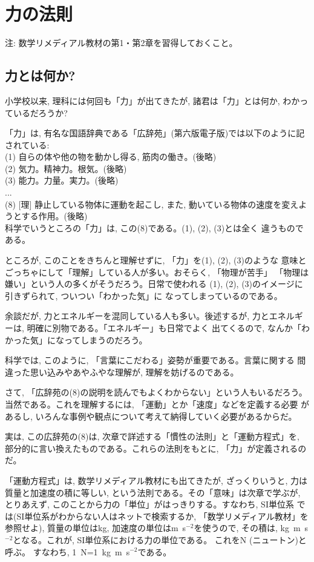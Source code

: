 \chapter{力の法則}
%
{\small 注: 数学リメディアル教材の第1・第2章を習得しておくこと。}

\section{力とは何か?}

小学校以来, 理科には何回も「力」が出てきたが, 諸君は「力」とは何か, わかっているだろうか?

「力」は, 有名な国語辞典である「広辞苑」(第六版電子版)では以下のように記されている:\\
(1) 自らの体や他の物を動かし得る, 筋肉の働き。(後略)\\
(2) 気力。精神力。根気。(後略)\\
(3) 能力。力量。実力。(後略)\\
...\\
(8) [理] 静止している物体に運動を起こし, また, 動いている物体の速度を変えようとする作用。(後略)\\

科学でいうところの「力」は, この(8)である。(1), (2), (3)とは全く
違うものである。

ところが, このことをきちんと理解せずに, 「力」を(1), (2), (3)のような
意味とごっちゃにして「理解」している人が多い。おそらく, 「物理が苦手」
「物理は嫌い」という人の多くがそうだろう。日常で使われる
(1), (2), (3)のイメージに引きずられて, ついつい「わかった気」に
なってしまっているのである。

余談だが, 力とエネルギーを混同している人も多い。後述するが, 
力とエネルギーは, 明確に別物である。「エネルギー」も日常でよく
出てくるので, なんか「わかった気」になってしまうのだろう。

科学では, このように, 「言葉にこだわる」姿勢が重要である。言葉に関する
間違った思い込みやあやふやな理解が, 理解を妨げるのである。

さて, 「広辞苑の(8)の説明を読んでもよくわからない」という人もいるだろう。
当然である。これを理解するには, 「運動」とか「速度」などを定義する必要
があるし, いろんな事例や観点について考えて納得していく必要があるからだ。

実は, この広辞苑の(8)は, 次章で詳述する「慣性の法則」と「運動方程式」を, 
部分的に言い換えたものである。これらの法則をもとに, 「力」が定義されるのだ。

「運動方程式」は, 数学リメディアル教材にも出てきたが, ざっくりいうと, 
力は質量と加速度の積に等しい, という法則である。その「意味」は次章で学ぶが, 
とりあえず, このことから力の「単位」がはっきりする。すなわち, SI単位系
では(SI単位系がわからない人はネットで検索するか, 「数学リメディアル教材」を
参照せよ), 質量の単位はkg, 加速度の単位はm~s$^{-2}$を使うので, 
その積は, kg~m~s$^{-2}$となる。これが, SI単位系における力の単位である。
これをN (ニュートン)と呼ぶ。
すなわち, 1~N=1~kg~m~s$^{-2}$である。


